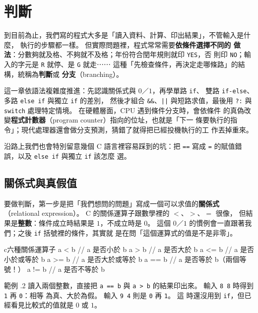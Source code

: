 \chapter{判斷}
\label{ch:conditionals}

到目前為止，我們寫的程式大多是「讀入資料、計算、印出結果」，不管輸入是什麼，
執行的步驟都一樣。 但實際問題裡，程式常常需要\textbf{依條件選擇不同的
做法}：分數夠就及格、不夠就不及格；年份符合閏年規則就印 \texttt{YES}，否
則印 \texttt{NO}；輸入的字元是 \texttt{R} 就停、是 \texttt{G} 就走⋯⋯
這種「先檢查條件，再決定走哪條路」的結構，統稱為\textbf{判斷}或
\textbf{分支}（branching）。

這一章依語法複雜度推進：先認識關係式與 $0$／$1$，再學單路 \texttt{if}、
雙路 \texttt{if-else}、多路 \texttt{else if} 與獨立 \texttt{if} 的差別，
然後才組合 \texttt{\&\&}、\texttt{||} 與短路求值，最後用 \texttt{?:} 與
\texttt{switch} 處理特定情境。 在硬體層面，CPU 遇到條件分支時，會依條件
的真偽改變\textbf{程式計數器}（program counter）指向的位址，也就是「下一
條要執行的指令」；現代處理器還會做分支預測，猜錯了就得把已經投機執行的工
作丟掉重來。

沿路上我們也會特別留意幾個 C 語言裡容易踩到的坑：把 \texttt{==} 寫成
\texttt{=} 的賦值錯誤，以及 \texttt{else if} 與獨立 \texttt{if} 該怎麼
選。

\section{關係式與真假值}
\label{sec:cond-relational}

要做判斷，第一步是把「我們想問的問題」寫成一個可以求值的\textbf{關係式}
（relational expression）。 C 的關係運算子跟數學裡的 $<$、$>$、$=$ 很像，
但結果是\textbf{整數}：條件成立時結果是 $1$，不成立時是 $0$。 這個
$0$／$1$ 的慣例會一直跟著我們；之後 \texttt{if} 括號裡的條件，其實就
是在問「這個運算式的值是不是非零」。

\begin{code}{c}{六種關係運算子}
a < b    // a 是否小於 b
a > b    // a 是否大於 b
a <= b   // a 是否小於或等於 b
a >= b   // a 是否大於或等於 b
a == b   // a 是否等於 b（兩個等號！）
a != b   // a 是否不等於 b
\end{code}

範例 \thechapter.2 讀入兩個整數，直接把 \texttt{a == b} 與 \texttt{a > b}
的結果印出來。 輸入 \texttt{8 8} 時得到 \texttt{1} 再 \texttt{0}：相等
為真、大於為假。 輸入 \texttt{9 4} 則是 \texttt{0} 再 \texttt{1}。 這
時還沒用到 \texttt{if}，但已經看見比較式的值就是 $0$ 或 $1$。

